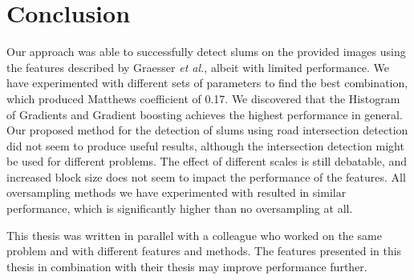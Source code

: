 \section{Conclusion}

Our approach was able to successfully detect slums on the provided images using the features described by Graesser \textit{et al.}, albeit with limited performance. We have experimented with different sets of parameters to find the best combination, which produced Matthews coefficient of 0.17. We discovered that the Histogram of Gradients and Gradient boosting achieves the highest performance in general. Our proposed method for the detection of slums using road intersection detection did not seem to produce useful results, although the intersection detection might be used for different problems. The effect of different scales is still debatable, and increased block size does not seem to impact the performance of the features. All oversampling methods we have experimented with resulted in similar performance, which is significantly higher than no oversampling at all. 

This thesis was written in parallel with a colleague who worked on the same problem and with different features and methods. The features presented in this thesis in combination with their thesis may improve performance further.










%
